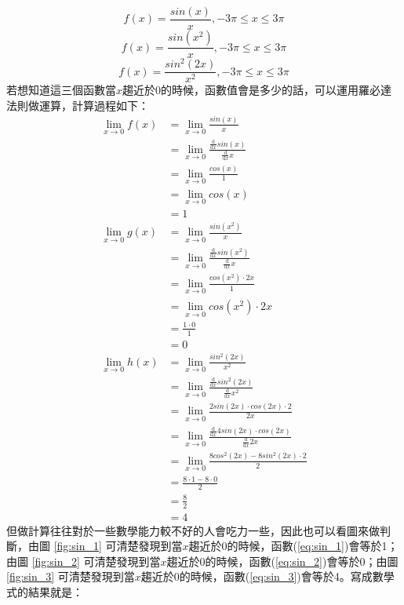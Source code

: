 \begin{equation}\label{eq:sin_1}
f(x)=\frac{sin(x)}{x},-3\pi\leq x\leq 3\pi
\end{equation}
\begin{equation}\label{eq:sin_2}
f(x)=\frac{sin(x^2)}{x},-3\pi\leq x\leq 3\pi
\end{equation}
\begin{equation}\label{eq:sin_3}
f(x)=\frac{sin^2(2x)}{x^2},-3\pi\leq x\leq 3\pi
\end{equation}
若想知道這三個函數當$x$趨近於0的時候，函數值會是多少的話，可以運用羅必達法則做運算，計算過程如下：
\begin{align*}
\lim_{x \rightarrow 0}f(x)&=\lim_{x \rightarrow 0}\frac{sin(x)}{x}\\
&=\lim_{x \rightarrow 0}\frac{\frac{\text{d}}{\text{d}x}sin(x)}{\frac{\text{d}}{\text{d}x}x}\\
&=\lim_{x \rightarrow 0}\frac{cos(x)}{1}\\
&=\lim_{x \rightarrow 0}cos(x)\\
&=1\\
\lim_{x \rightarrow 0}g(x)&=\lim_{x \rightarrow 0}\frac{sin(x^2)}{x}\\
&=\lim_{x \rightarrow 0}\frac{\frac{\text{d}}{\text{d}x}sin(x^2)}{\frac{\text{d}}{\text{d}x}x}\\
&=\lim_{x \rightarrow 0}\frac{cos(x^2)\cdot2x}{1}\\
&=\lim_{x \rightarrow 0}cos(x^2)\cdot2x\\
&=\frac{1\cdot0}{1}\\
&=0\\
\lim_{x \rightarrow 0}h(x)&=\lim_{x \rightarrow 0}\frac{sin^2(2x)}{x^2}\\
&=\lim_{x \rightarrow 0}\frac{\frac{\text{d}}{\text{d}x}sin^2(2x)}{\frac{\text{d}}{\text{d}x}x^2}\\
&=\lim_{x \rightarrow 0}\frac{2sin(2x)\cdot cos(2x)\cdot2}{2x}\\
&=\lim_{x \rightarrow 0}\frac{\frac{\text{d}}{\text{d}x}4sin(2x)\cdot cos(2x)}{\frac{\text{d}}{\text{d}x}2x}\\
&=\lim_{x \rightarrow 0}\frac{8cos^2(2x)-8sin^2(2x)\cdot2}{2}\\
&=\frac{8\cdot1-8\cdot0}{2}\\
&=\frac{8}{2}\\
&=4
\end{align*}
但做計算往往對於一些數學能力較不好的人會吃力一些，因此也可以看圖來做判斷，由圖 \ref{fig:sin_1} 可清楚發現到當$x$趨近於0的時候，函數(\ref{eq:sin_1})會等於1；由圖 \ref{fig:sin_2} 可清楚發現到當$x$趨近於0的時候，函數(\ref{eq:sin_2})會等於0；由圖 \ref{fig:sin_3} 可清楚發現到當$x$趨近於0的時候，函數(\ref{eq:sin_3})會等於4。寫成數學式的結果就是：
